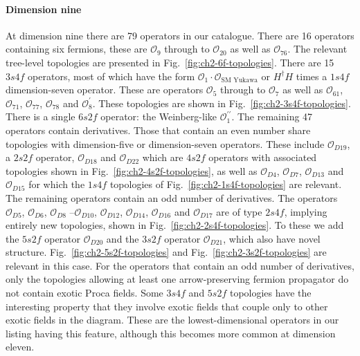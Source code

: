 \paragraph{Dimension nine} At dimension nine there are 79 operators in our
catalogue. There are 16 operators containing six fermions, these are
$\mathcal{O}_{9}$ through to $\mathcal{O}_{20}$ as well as $\mathcal{O}_{76}$.
The relevant tree-level topologies are presented in
Fig.~\ref{fig:ch2-6f-topologies}. There are 15 $3s4f$ operators, most of which have
the form $\mathcal{O}_{1} \cdot \mathcal{O}_{\text{SM Yukawa}}$ or $H^\dagger H$
times a $1s4f$ dimension-seven operator. These are operators $\mathcal{O}_{5}$
through to $\mathcal{O}_{7}$ as well as $\mathcal{O}_{61}$, $\mathcal{O}_{71}$,
$\mathcal{O}_{77}$, $\mathcal{O}_{78}$ and $\mathcal{O}_{8}^{\prime}$. These
topologies are shown in Fig.~\ref{fig:ch2-3s4f-topologies}. There is a single $6s2f$
operator: the Weinberg-like $\mathcal{O}_{1}^{\prime\prime}$. The remaining 47
operators contain derivatives. Those that contain an even number share
topologies with dimension-five or dimension-seven operators. These include
$\mathcal{O}_{D19}$, a $2s2f$ operator, $\mathcal{O}_{D18}$ and
$\mathcal{O}_{D22}$ which are $4s2f$ operators with associated topologies shown
in Fig.~\ref{fig:ch2-4s2f-topologies}, as well as $\mathcal{O}_{D4}$,
$\mathcal{O}_{D7}$, $\mathcal{O}_{D13}$ and $\mathcal{O}_{D15}$ for which the
$1s4f$ topologies of Fig.~\ref{fig:ch2-1s4f-topologies} are relevant. The remaining
operators contain an odd number of derivatives. The operators
$\mathcal{O}_{D5}$, $\mathcal{O}_{D6}$, $\mathcal{O}_{D8}\text{ --
}\mathcal{O}_{D10}$, $\mathcal{O}_{D12}$, $\mathcal{O}_{D14}$,
$\mathcal{O}_{D16}$ and $\mathcal{O}_{D17}$ are of type $2s4f$, implying
entirely new topologies, shown in Fig.~\ref{fig:ch2-2s4f-topologies}. To these we
add the $5s2f$ operator $\mathcal{O}_{D20}$ and the $3s2f$ operator
$\mathcal{O}_{D21}$, which also have novel structure.
Fig.~\ref{fig:ch2-5s2f-topologies} and Fig.~\ref{fig:ch2-3s2f-topologies} are relevant
in this case. For the operators that contain an odd number of derivatives, only
the topologies allowing at least one arrow-preserving fermion propagator do not
contain exotic Proca fields. Some $3s4f$ and $5s2f$ topologies have the
interesting property that they involve exotic fields that couple only to other
exotic fields in the diagram. These are the lowest-dimensional operators in our
listing having this feature, although this becomes more common at dimension
eleven.

